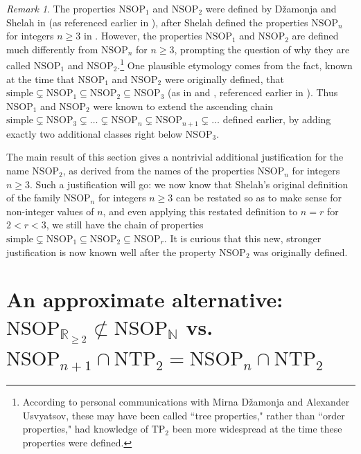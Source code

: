 \documentclass{amsart}
\theoremstyle{definition}
\theoremstyle{remark}
\newtheorem{remark}[theorem]{Remark}
\numberwithin{equation}{section}
\begin{document}
\begin{remark}
    The properties $\mathrm{NSOP}_{1}$ and $\mathrm{NSOP}_{2}$ were defined by Džamonja and Shelah in \cite{DS04} (as referenced earlier in \cite{Sh99}), after Shelah defined the properties $\mathrm{NSOP}_{n}$ for integers $n \geq 3$ in \cite{She95}. However, the properties $\mathrm{NSOP}_{1}$ and $\mathrm{NSOP}_{2}$ are defined much differently from $\mathrm{NSOP}_{n}$ for $n \geq 3$, prompting the question of why they are called $\mathrm{NSOP}_{1}$ and $\mathrm{NSOP}_{2}$.\footnote{According to personal communications with Mirna Džamonja and Alexander Usvyatsov, these may have been called ``tree properties," rather than ``order properties," had knowledge of $\mathrm{TP}_{2}$ been more widespread at the time these properties were defined.} One plausible etymology comes from the fact, known at the time that $\mathrm{NSOP}_{1}$ and $\mathrm{NSOP}_{2}$ were originally defined, that $\mathrm{simple} \subsetneq \mathrm{NSOP}_{1} \subseteq \mathrm{NSOP}_{2} \subseteq \mathrm{NSOP}_{3}$ (as in \cite{DS04} and \cite{SU08}, referenced earlier in \cite{Sh99}). Thus $\mathrm{NSOP}_{1}$ and $\mathrm{NSOP}_{2}$ were known to extend the ascending chain $\mathrm{simple} \subsetneq \mathrm{NSOP}_{3} \subsetneq \ldots \subsetneq\mathrm{NSOP}_n \subsetneq  \mathrm{NSOP}_{n+1 }\subsetneq \ldots $ defined earlier, by adding exactly two additional classes right below $\mathrm{NSOP}_{3}$.

    The main result of this section gives a nontrivial additional justification for the name $\mathrm{NSOP}_{2}$, as derived from the names of the properties $\mathrm{NSOP}_{n}$ for integers $n \geq 3$. Such a justification will go: we now know that Shelah's original definition of the family $\mathrm{NSOP}_{n}$ for integers $n \geq 3$ can be restated so as to make sense for non-integer values of $n$, and even applying this restated definition to $n = r$ for $2 < r < 3$, we still have the chain of properties  $\mathrm{simple} \subsetneq \mathrm{NSOP}_{1} \subseteq \mathrm{NSOP}_{2} \subseteq \mathrm{NSOP}_{r}$. It is curious that this new, stronger justification is now known well after the property $\mathrm{NSOP}_{2}$ was originally defined.
\end{remark}


\section{An approximate alternative: $\mathrm{NSOP}_{\mathbb{R
}_{\geq 2}} \not\subset \mathrm{NSOP}_{\mathbb{N}}$ vs. $\mathrm{NSOP}_{n+1} \cap \mathrm{NTP}_{2} = \mathrm{NSOP}_{n} \cap \mathrm{NTP}_{2}$}\label{the approximate alternative}
\end{document}
